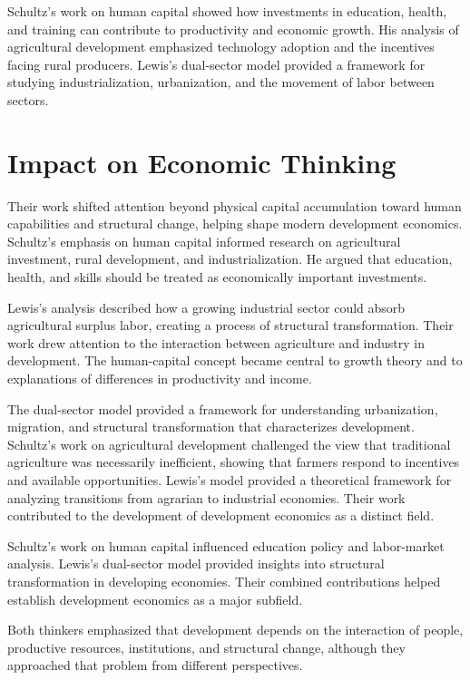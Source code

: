 Schultz's work on human capital showed how investments in education, health, and training can
contribute to productivity and economic growth. His analysis of agricultural development
emphasized technology adoption and the incentives facing rural producers. Lewis's dual-sector
model provided a framework for studying industrialization, urbanization, and the movement of labor
between sectors.

\section{Impact on Economic Thinking}
Their work shifted attention beyond physical capital accumulation toward human capabilities and
structural change, helping shape modern development economics. Schultz's emphasis on human capital
informed research on agricultural investment, rural development, and industrialization. He argued
that education, health, and skills should be treated as economically important investments.

Lewis's analysis described how a growing industrial sector could absorb agricultural surplus labor,
creating a process of structural transformation. Their work drew attention to the interaction
between agriculture and industry in development. The human-capital concept became central to
growth theory and to explanations of differences in productivity and income.

The dual-sector model provided a framework for understanding urbanization, migration, and structural
transformation that characterizes development. Schultz's work on agricultural development
challenged the view that traditional agriculture was necessarily inefficient, showing that farmers
respond to incentives and available opportunities. Lewis's model provided a theoretical framework
for analyzing transitions from agrarian to industrial economies. Their work contributed to the
development of development economics as a distinct field.

Schultz's work on human capital influenced education policy and labor-market analysis. Lewis's
dual-sector model provided insights into structural transformation in developing economies. Their
combined contributions helped establish development economics as a major subfield.

Both thinkers emphasized that development depends on the interaction of people, productive
resources, institutions, and structural change, although they approached that problem from
different perspectives.

